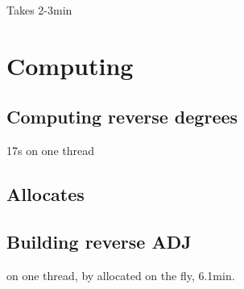 \documentclass[11pt,a4paper]{article}
\begin{document}
Takes 2-3min

\section{Computing }

\subsection{Computing reverse degrees}
17s on one thread

\subsection{Allocates}

\subsection{Building reverse ADJ}
on one thread, by allocated on the fly, 6.1min.
\end{document}
